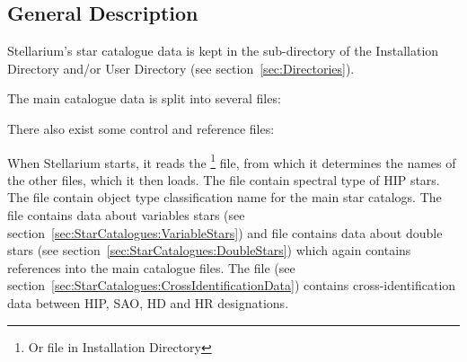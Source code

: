 \subsection{General Description}%
\label{sec:Catalogues:stars:general}

Stellarium's star catalogue data is kept in the 
sub-directory of the Installation Directory and/or User Directory (see
section~\ref{sec:Directories}).

The main catalogue data is split into several files:

\begin{description}
\item[]
\item[]
\item[]
\item[]
\item[]
\item[]
\item[]
\item[]
\item[]
\end{description}

There also exist some control and reference files:

\begin{description}
\item[]
\item[]
\item[]
\item[]
\item[]
\item[]
\item[]
\end{description}

When Stellarium starts, it reads the \footnote{Or  file in Installation Directory} file, from which it determines the 
names of the other files, which it then loads. The file  
contain spectral type of HIP stars. The file  
contain object type classification name for the main star catalogs. 
The file  contains data about variables stars
(see section~\ref{sec:StarCatalogues:VariableStars}) and file  
contains data about double stars (see section~\ref{sec:StarCatalogues:DoubleStars}) 
which again contains references into the main catalogue files.
The file  (see section~\ref{sec:StarCatalogues:CrossIdentificationData}) contains cross-identification data between HIP, SAO, HD and HR designations.

